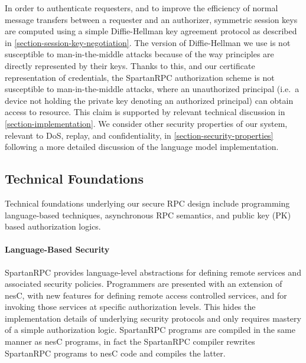 In order to authenticate requesters, and to improve the efficiency of
normal message transfers between a requester and an authorizer,
symmetric session keys are computed using a simple Diffie-Hellman key
agreement protocol \cite{Diffie:2006:NDC:2263321.2269104} as described
in \autoref{section-session-key-negotiation}. The version of
Diffie-Hellman we use is not susceptible to man-in-the-middle attacks
because of the way principles are directly represented by their keys.
Thanks to this, and our certificate representation of credentials, the
SpartanRPC authorization scheme is not susceptible to man-in-the-middle
attacks, where an unauthorized principal (i.e.~a device not holding the
private key denoting an authorized principal) can obtain access to
resource. This claim is supported by relevant technical discussion in
\autoref{section-implementation}. We consider other security properties
of our system, relevant to DoS, replay, and confidentiality, in
\autoref{section-security-properties} following a more detailed
discussion of the language model implementation.


\subsection{Technical Foundations}

Technical foundations underlying our secure RPC design include
programming language-based techniques, asynchronous RPC semantics, and
public key (PK) based authorization logics.

\paragraph{Language-Based Security} SpartanRPC provides language-level
abstractions for defining remote services and associated security
policies. Programmers are presented with an extension of nesC, with new
features for defining remote access controlled services, and for
invoking those services at specific authorization levels. This hides the
implementation details of underlying security protocols and only
requires mastery of a simple authorization logic. SpartanRPC programs
are compiled in the same manner as nesC programs, in fact the SpartanRPC
compiler rewrites SpartanRPC programs to nesC code and compiles the
latter.

